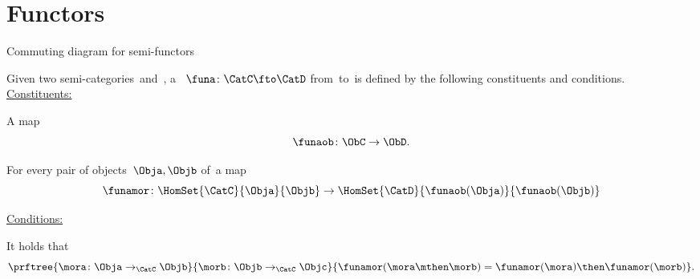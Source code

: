 
\section{Functors}

\begin{marginfigure}
  \begin{center}
  \end{center}
  \caption{Commuting diagram for semi-functors}
  \label{fig:functor_detail}
\end{marginfigure}


\begin{ctdefinition}
  \label{def:semi-functor}
  Given two semi-categories~\CatC and~\CatD, a \emph{}~$\funa\colon \CatC\fto \CatD$ from~\CatC to~\CatD is defined by the following constituents and conditions. \\
  \underline{Constituents:}
  \begin{compactenum}
    [i)]
    \item A map
    \begin{equation}
      \funaob\colon \ObC \to \ObD.
     \end{equation}
    \item For every pair of objects~$\Obja, \Objb$ of~\CatC a map
    \begin{equation}
      \funamor\colon \HomSet{\CatC}{\Obja}{\Objb} \to \HomSet{\CatD}{\funaob(\Obja)}{\funaob(\Objb)}
    \end{equation}
  \end{compactenum}
  \underline{Conditions:}
  \begin{compactenum}
    \item It holds that
    \begin{equation}
      \prftree{\mora\colon \Obja \to_{\CatC} \Objb}{\morb\colon \Objb \to_{\CatC} \Objc}{
      \funamor(\mora \mthen \morb)=\funamor(\mora)\then \funamor(\morb)
      }.
    \end{equation}
  \end{compactenum}
\end{ctdefinition}

